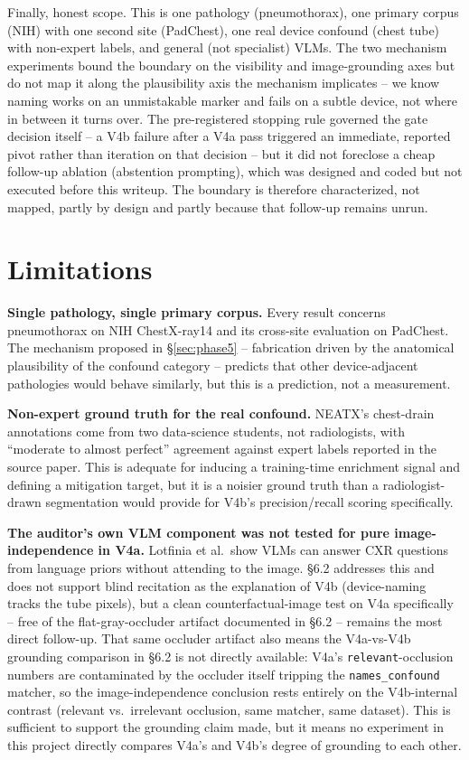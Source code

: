\documentclass{ieeeaccess}
\begin{document}
Finally, honest scope. This is one pathology (pneumothorax), one primary
corpus (NIH) with one second site (PadChest), one real device confound
(chest tube) with non-expert labels, and general (not specialist) VLMs. The
two mechanism experiments bound the boundary on the visibility and
image-grounding axes but do not map it along the plausibility axis the
mechanism implicates -- we know naming works on an unmistakable marker and
fails on a subtle device, not where in between it turns over. The
pre-registered stopping rule governed the gate decision itself -- a V4b
failure after a V4a pass triggered an immediate, reported pivot rather than
iteration on that decision -- but it did not foreclose a cheap follow-up
ablation (abstention prompting), which was designed and coded but not
executed before this writeup. The boundary is therefore characterized, not
mapped, partly by design and partly because that follow-up remains unrun.

\section{Limitations}
\label{sec:limitations}
\textbf{Single pathology, single primary corpus.} Every result concerns
pneumothorax on NIH ChestX-ray14 and its cross-site evaluation on PadChest.
The mechanism proposed in \S\ref{sec:phase5} -- fabrication driven by the
anatomical plausibility of the confound category -- predicts that other
device-adjacent pathologies would behave similarly, but this is a
prediction, not a measurement.

\textbf{Non-expert ground truth for the real confound.} NEATX's chest-drain
annotations come from two data-science students, not radiologists, with
``moderate to almost perfect'' agreement against expert labels reported in
the source paper. This is adequate for inducing a training-time enrichment
signal and defining a mitigation target, but it is a noisier ground truth
than a radiologist-drawn segmentation would provide for V4b's
precision/recall scoring specifically.

\textbf{The auditor's own VLM component was not tested for pure
image-independence in V4a.} Lotfinia et al.\ show VLMs can answer CXR
questions from language priors without attending to the image. \S6.2
addresses this and does not support blind recitation as the explanation of
V4b (device-naming tracks the tube pixels), but a clean counterfactual-image
test on V4a specifically -- free of the flat-gray-occluder artifact documented
in \S6.2 -- remains the most direct follow-up. That same occluder artifact
also means the V4a-vs-V4b grounding comparison in \S6.2 is not directly
available: V4a's \texttt{relevant}-occlusion numbers are contaminated by the
occluder itself tripping the \texttt{names\_confound} matcher, so the
image-independence conclusion rests entirely on the V4b-internal contrast
(relevant vs.\ irrelevant occlusion, same matcher, same dataset). This is
sufficient to support the grounding claim made, but it means no experiment
in this project directly compares V4a's and V4b's degree of grounding to
each other.
\end{document}
